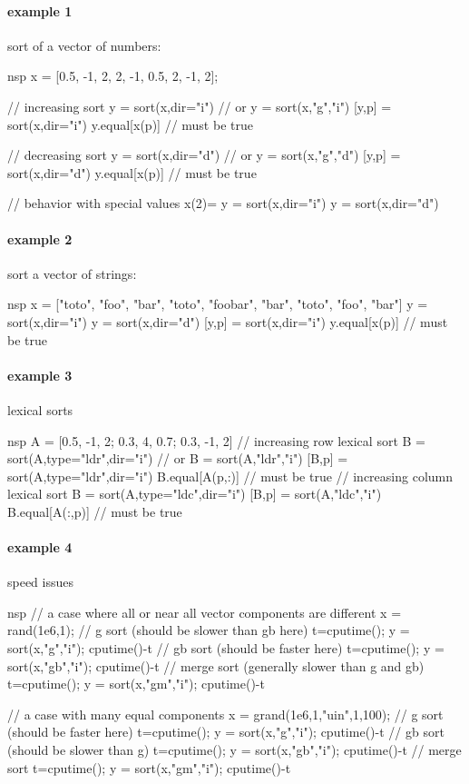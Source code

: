 \begin{examples}

\paragraph{example 1} sort of a vector of numbers:
\begin{mintednsp}{nsp}
x = [0.5, -1, 2, 2, -1, 0.5, 2, -1, 2];

// increasing sort
y = sort(x,dir="i") // or y = sort(x,"g","i")
[y,p] = sort(x,dir="i")
y.equal[x(p)]  // must be true

// decreasing sort
y = sort(x,dir="d") // or y = sort(x,"g","d")
[y,p] = sort(x,dir="d")
y.equal[x(p)]  // must be true

// behavior with special values
x(2)= %
y = sort(x,dir="i")
y = sort(x,dir="d")
\end{mintednsp}

\paragraph{example 2} sort a vector of strings:
\begin{mintednsp}{nsp}
x = ["toto", "foo", "bar", "toto", "foobar", "bar", "toto", "foo", "bar"]
y = sort(x,dir="i")
y = sort(x,dir="d")
[y,p] = sort(x,dir="i")
y.equal[x(p)]  // must be true
\end{mintednsp}

\paragraph{example 3} lexical sorts
\begin{mintednsp}{nsp}
A = [0.5, -1, 2; 0.3, 4, 0.7; 0.3, -1, 2]
// increasing row lexical sort
B = sort(A,type="ldr",dir="i") // or B = sort(A,"ldr","i")
[B,p] = sort(A,type="ldr",dir="i")
B.equal[A(p,:)]  // must be true
// increasing column lexical sort
B = sort(A,type="ldc",dir="i")
[B,p] = sort(A,"ldc","i")
B.equal[A(:,p)]  // must be true
\end{mintednsp}

\paragraph{example 4} speed issues
\begin{mintednsp}{nsp}
// a case where all or near all vector components are different
x = rand(1e6,1);
// g sort (should be slower than gb here)
t=cputime(); y = sort(x,"g","i"); cputime()-t
// gb sort (should be faster here)
t=cputime(); y = sort(x,"gb","i"); cputime()-t
// merge sort (generally slower than g and gb)
t=cputime(); y = sort(x,"gm","i"); cputime()-t

// a case with many equal components
x = grand(1e6,1,"uin",1,100);
// g sort (should be faster here)
t=cputime(); y = sort(x,"g","i"); cputime()-t
// gb sort (should be slower than g)
t=cputime(); y = sort(x,"gb","i"); cputime()-t
// merge sort
t=cputime(); y = sort(x,"gm","i"); cputime()-t
\end{mintednsp}

\end{examples}

